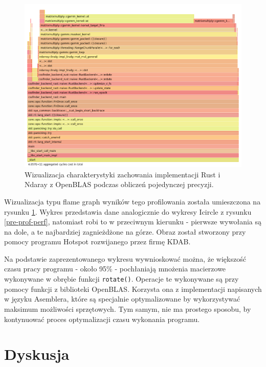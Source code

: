 \documentclass[11pt, a4paper]{article}
\newcommand{\code}[1]{\texttt{#1}}
\begin{document}
\begin{sloppypar}
    \begin{figure}[!ht]
      \centering
      \includegraphics[width=1.0\textwidth]{"resources/rust_flame_graph_perf.png"}
      \caption{Wizualizacja charakterystyki zachowania implementacji Rust i Ndaray z OpenBLAS podczas obliczeń pojedynczej precyzji.}
      \label{rust-flame-graph-prof}
    \end{figure}

    Wizualizacja typu flame graph wyników tego profilowania została umieszczona na rysunku
    \ref{rust-flame-graph-prof}. Wykres przedstawia dane analogicznie do wykresy Icircle
    z rysunku \ref{pre-prof-perf}, natomiast robi to w przeciwnym kierunku - pierwsze wywołania
    są na dole, a te najbardziej zagnieżdżone na górze. Obraz został stworzony przy pomocy
    programu Hotspot \cite{HOTSPOT} rozwijanego przez firmę KDAB.

    Na podstawie zaprezentowanego wykresu wywnioskować można, że większość czasu pracy
    programu - około 95\% - pochłaniają mnożenia macierzowe wykonywane w obrębie funkcji
    \code{rotate()}. Operacje te wykonywane są przy pomocy funkcji z biblioteki OpenBLAS.
    Korzysta ona z implementacji napisanych w języku Asemblera, które są specjalnie optymalizowane
    by wykorzystywać maksimum możliwości sprzętowych. Tym samym, nie ma prostego sposobu,
    by kontynuować proces optymalizacji czasu wykonania programu.

    \FloatBarrier

    \section{Dyskusja}

\end{sloppypar}
\end{document}
